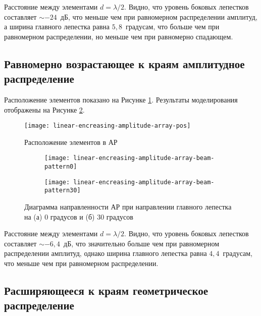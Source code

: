 Расстояние между элементами $d=\lambda/2$. Видно, что уровень боковых лепестков составляет $\sim-24$~дБ, 
что меньше чем при равномерном распределении амплитуд, 
а ширина главного лепестка равна $5,8$~градусам, 
что больше чем при равномерном распределении, но меньше чем при равномерно спадающем.

\subsection{Равномерно возрастающее к краям амплитудное распределение}

Расположение элементов показано на Рисунке \ref{fig:linear-encreasing-amplitude-array-pos}. Результаты моделирования отображены на Рисунке \ref{fig:linear-encreasing-amplitude-array-modeling}.

\begin{figure}[!ht]
    \centering
    \texttt{[image: linear-encreasing-amplitude-array-pos]}
    \caption{Расположение элементов в АР}
    \label{fig:linear-encreasing-amplitude-array-pos}
\end{figure}


\begin{figure}[!ht]
    \centering
    \begin{subfigure}[b]{0.49\textwidth}
        \centering
        \hspace*{-3ex}
        \texttt{[image: linear-encreasing-amplitude-array-beam-pattern0]}
        \caption{}%
    \end{subfigure}
    \hfill
    \begin{subfigure}[b]{0.49\textwidth}
        \centering
        \hspace*{-3ex}
        \texttt{[image: linear-encreasing-amplitude-array-beam-pattern30]}
        \caption{}%
    \end{subfigure}
    \caption{%
    Диаграмма направленности АР при направлении главного лепестка на (а) 0 градусов и (б) 30 градусов
    }%
    \label{fig:linear-encreasing-amplitude-array-modeling}
\end{figure}

Расстояние между элементами $d=\lambda/2$. Видно, что уровень боковых лепестков составляет $\sim-6,4$~дБ, 
что значительно больше чем при равномерном распределении амплитуд, 
однако ширина главного лепестка равна $4,4$~градусам, 
что меньше чем при равномерном распределении.

\subsection{Расширяющееся к краям геометрическое распределение}

